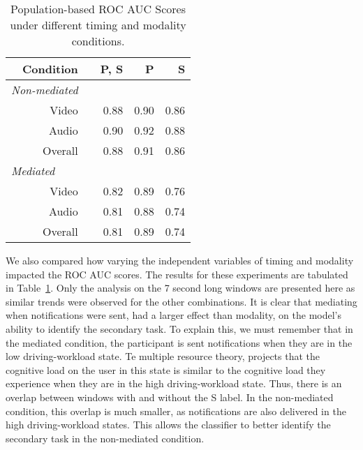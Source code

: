 \begin{table}
\centering
\begin{tabular}{@{}rcrrr@{}}\toprule
Condition & \phantom{abc} & P, S & P & S\\
 \midrule
\multicolumn{1}{l}{\textit{Non-mediated \phantom{abcde}}} \\
 Video  && 0.88 & 0.90 & 0.86 \\
 Audio  && 0.90 & 0.92 & 0.88 \\
 Overall && 0.88 & 0.91 & 0.86 \\
\multicolumn{1}{l}{\textit{Mediated}} \\
 Video && 0.82 & 0.89 & 0.76 \\
 Audio && 0.81 & 0.88 & 0.74 \\
Overall && 0.81 & 0.89 & 0.74 \\
 \bottomrule
\end{tabular}
\caption{Population-based ROC AUC Scores under different timing and modality conditions.}
\label{Tab:NM}
\end{table}

We also compared how varying the independent variables of timing and modality impacted the ROC AUC scores. The results for these experiments are tabulated in Table~\ref{Tab:NM}. Only the analysis on the 7 second long windows are presented here as similar trends were observed for the other combinations. It is clear that mediating when notifications were sent, had a larger effect than modality, on the model's ability to identify the secondary task. To explain this, we must remember that in the mediated condition, the participant is sent notifications when they are in the low driving-workload state. Te multiple resource theory, projects that  the cognitive load on the user in this state is similar to the cognitive load they experience when they are in the high driving-workload state. Thus, there is an overlap between windows with and without the S label. In the non-mediated condition, this overlap is much smaller, as notifications are also delivered in the high driving-workload states. This allows the classifier to better identify the secondary task in the non-mediated condition.







